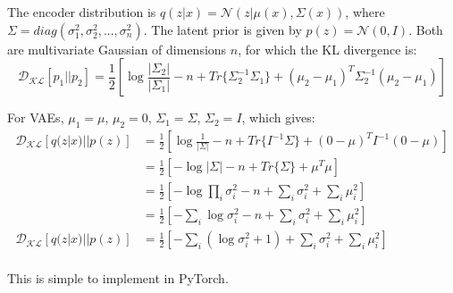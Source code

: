 The encoder distribution is $q(z|x) = \mathcal{N}(z|\mu(x),\Sigma(x))$, where $\Sigma=diag(\sigma_1^2, \sigma_2^2, ..., \sigma_n^2)$.
The latent prior is given by $p(z) = \mathcal{N}(0, I)$.
Both are multivariate Gaussian of dimensions $n$, for which the KL divergence is:
\begin{equation}
    \mathcal{D_{KL}}[p_1||p_2] = \frac{1}{2} \left[ \log \frac{|\Sigma_2|}{|\Sigma_1|} - n + Tr\{\Sigma_2^{-1}\Sigma_1\} + (\mu_2 - \mu_1)^T \Sigma_2^{-1} (\mu_2-\mu_1) \right]
\end{equation}

For VAEs, $\mu_1 = \mu$, $\mu_2 = 0$, $\Sigma_1 = \Sigma$, $\Sigma_2 = I$, which gives:
\begin{equation}
    \begin{split}
        \mathcal{D_{KL}}[q(z|x)||p(z)] &= \frac{1}{2} \left[ \log \frac{1}{|\Sigma|} - n + Tr\{I^{-1}\Sigma\} + (0 - \mu)^T I^{-1} (0-\mu) \right] \\
        &= \frac{1}{2} \left[ -\log |\Sigma| - n + Tr\{\Sigma\} + \mu^T\mu \right] \\
        &= \frac{1}{2} \left[ -\log \prod_i \sigma_i^2 - n + \sum_i \sigma_i^2 + \sum_i \mu_i^2 \right] \\
        &= \frac{1}{2} \left[ -\sum_i \log\sigma_i^2 - n + \sum_i \sigma_i^2 + \sum_i \mu_i^2 \right] \\
        \mathcal{D_{KL}}[q(z|x)||p(z)] &= \frac{1}{2} \left[ -\sum_i(\log\sigma_i^2 + 1) + \sum_i \sigma_i^2 + \sum_i \mu_i^2 \right] \\
    \end{split}
\end{equation}

This is simple to implement in PyTorch.

